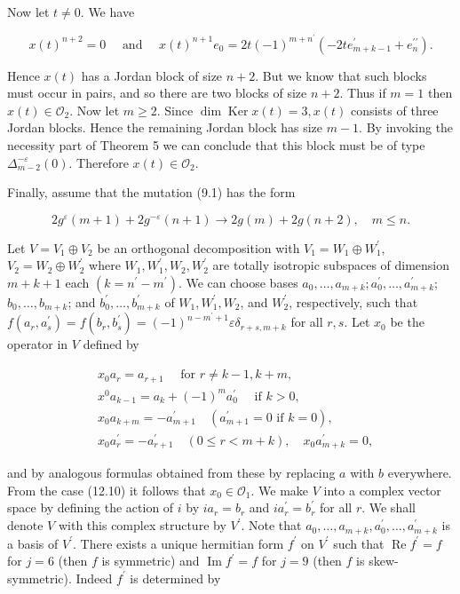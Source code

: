 \documentclass[10pt]{article}
\begin{document}
Now let $t \neq 0$. We have

$$
x(t)^{n+2}=0 \quad \text { and } \quad x(t)^{n+1} e_{0}=2 t(-1)^{m+n^{\prime}}\left(-2 t e_{m+k-1}^{\prime}+e_{n}^{\prime \prime}\right) .
$$

Hence $x(t)$ has a Jordan block of size $n+2$. But we know that such blocks must occur in pairs, and so there are two blocks of size $n+2$. Thus if $m=1$ then $x(t) \in \mathcal{O}_{2}$. Now let $m \geqslant 2$. Since $\operatorname{dim} \operatorname{Ker} x(t)=3, x(t)$ consists of three Jordan blocks. Hence the remaining Jordan block has size $m-1$. By invoking the necessity part of Theorem 5 we can conclude that this block must be of type $\Delta_{m-2}^{-\varepsilon}(0)$. Therefore $x(t) \in \mathcal{O}_{2}$.

Finally, assume that the mutation (9.1) has the form


\begin{equation*}
2 g^{\varepsilon}(m+1)+2 g^{-\varepsilon}(n+1) \rightarrow 2 g(m)+2 g(n+2), \quad m \leqslant n . \tag{12.19}
\end{equation*}


Let $V=V_{1} \oplus V_{2}$ be an orthogonal decomposition with $V_{1}=W_{1} \oplus W_{1}^{\prime}$, $V_{2}=W_{2} \oplus W_{2}^{\prime}$ where $W_{1}, W_{1}^{\prime}, W_{2}, W_{2}^{\prime}$ are totally isotropic subspaces of dimension $m+k+1$ each $\left(k=n^{\prime}-m^{\prime}\right)$. We can choose bases $a_{0}, \ldots, a_{m+k} ; a_{0}^{\prime}, \ldots, a_{m+k}^{\prime}$; $b_{0}, \ldots, b_{m+k}$; and $b_{0}^{\prime}, \ldots, b_{m+k}^{\prime}$ of $W_{1}, W_{1}^{\prime}, W_{2}$, and $W_{2}^{\prime}$, respectively, such that $f\left(a_{r}, a_{s}^{\prime}\right)=f\left(b_{r}, b_{s}^{\prime}\right)=(-1)^{n-m^{\prime}+1} \varepsilon \delta_{r+s, m+k}$ for all $r, s$. Let $x_{0}$ be the operator in $V$ defined by

$$
\begin{aligned}
& x_{0} a_{r}=a_{r+1} \quad \text { for } r \neq k-1, k+m, \\
& x^{0} a_{k-1}=a_{k}+(-1)^{m} a_{0}^{\prime} \quad \text { if } k>0, \\
& x_{0} a_{k+m}=-a_{m+1}^{\prime} \quad\left(a_{m+1}^{\prime}=0 \text { if } k=0\right), \\
& x_{0} a_{r}^{\prime}=-a_{r+1}^{\prime} \quad(0 \leqslant r<m+k), \quad x_{0} a_{m+k}^{\prime}=0,
\end{aligned}
$$

and by analogous formulas obtained from these by replacing $a$ with $b$ everywhere. From the case (12.10) it follows that $x_{0} \in \mathcal{O}_{1}$. We make $V$ into a complex vector space by defining the action of $i$ by $i a_{r}=b_{r}$ and $i a_{r}^{\prime}=b_{r}^{\prime}$ for all $r$. We shall denote $V$ with this complex structure by $V^{\prime}$. Note that $a_{0}, \ldots, a_{m+k}, a_{0}^{\prime}, \ldots, a_{m+k}^{\prime}$ is a basis of $V^{\prime}$. There exists a unique hermitian form $f^{\prime}$ on $V^{\prime}$ such that $\operatorname{Re} f^{\prime}=f$ for $j=6$ (then $f$ is symmetric) and $\operatorname{Im} f^{\prime}=f$ for $j=9$ (then $f$ is skew-symmetric). Indeed $f^{\prime}$ is determined by
\end{document}
